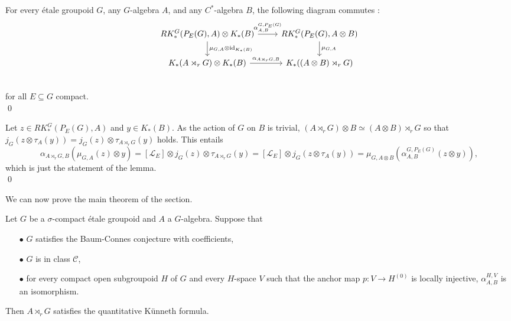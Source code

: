 \begin{lem}\label{KunnethLemma}
For every étale groupoid $G$, any $G$-algebra $A$, and any $C^*$-algebra $B$, the following diagram commutes :
\[\begin{tikzcd}
RK_*^G(P_E(G),A)\otimes K_*(B) \arrow{r}{\alpha^{G,P_E(G)}_{A,B}}\arrow{d}{\mu_{G,A}\otimes \text{id}_{K_*(B)}} & 
RK_*^G(P_E(G),A\otimes B) \arrow{d}{\mu_{G,A}} \\
K_*(A\rtimes_r G)\otimes K_*(B) \arrow{r}{\alpha_{A\rtimes_r G,B}} & 
K_*((A\otimes B)\rtimes_r G)\\
\end{tikzcd}\] 
for all $E\subseteq G$ compact. \\
\qed
\end{lem}

\begin{dem}
Let $z\in RK_*^G(P_E(G),A)$ and $y\in K_*(B)$. As the action of $G$ on $B$ is trivial, $(A\rtimes_r G)\otimes B\simeq (A\otimes B)\rtimes_r G$ so that $j_G(z \otimes \tau_A(y))= j_G(z) \otimes \tau_{A\rtimes_r G}(y)$ holds. This entails
\[\alpha_{A\rtimes_r G, B}(\mu_{G,A}(z)\otimes y)= [\mathcal L_E] \otimes j_G(z)\otimes \tau_{A\rtimes_r G}(y) = 
[\mathcal L_E] \otimes j_G( z\otimes \tau_A(y) ) = \mu_{G,A\otimes B}(\alpha^{G,P_E(G)}_{A,B}(z\otimes y)) ,\]
which is just the statement of the lemma.\\
\qed
\end{dem}


We can now prove the main theorem of the section.

\begin{thm}\label{Kunneth}
Let $G$ be a $\sigma$-compact étale groupoid and $A$ a $G$-algebra. Suppose that 
\begin{itemize}
\item[$\bullet$] $G$ satisfies the Baum-Connes conjecture with coefficients,
\item[$\bullet$] $G$ is in class $\mathcal C$,
\item[$\bullet$] for every compact open subgroupoid $H$ of $G$ and every $H$-space $V$ such that the anchor map $p : V \rightarrow H^{(0)}$ is locally injective, $\alpha_{A,B}^{H,V}$ is an isomorphism.
\end{itemize} 
Then $A\rtimes_r G$ satisfies the quantitative Künneth formula.
\end{thm}

